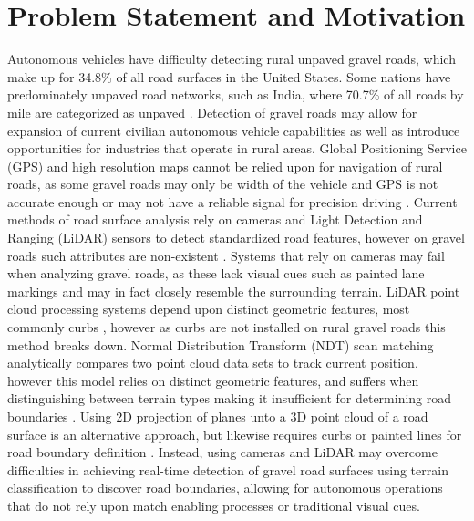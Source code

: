\documentclass[numbered,pdftex]{ohio-etd}
\begin{document}
\section{Problem Statement and Motivation}
{
	
	{Autonomous vehicles have difficulty detecting rural unpaved gravel roads, which make up for 34.8\% \cite{road_stats_2} of all road surfaces in the United States. Some nations have predominately unpaved road networks, such as India, where 70.7\% of all roads by mile are categorized as unpaved \cite{malik_lal_2019}. Detection of gravel roads may allow for expansion of current civilian autonomous vehicle capabilities as well as introduce opportunities for industries that operate in rural areas. Global Positioning Service (GPS) and high resolution maps cannot be relied upon for navigation of rural roads, as some gravel roads may only be width of the vehicle and GPS is not accurate enough or may not have a reliable signal for precision driving \cite{noauthor_gpsgov_nodate}. Current methods of road surface analysis rely on cameras and Light Detection and Ranging (LiDAR) sensors to detect standardized road features, however on gravel roads such attributes are non-existent \cite{skorseth_gravel_nodate}. Systems that rely on cameras may fail when analyzing gravel roads, as these lack visual cues such as painted lane markings \cite{crisman_scarf_1993} and may in fact closely resemble the surrounding terrain. LiDAR point cloud processing systems depend upon distinct geometric features, most commonly curbs \cite{yadav_extraction_2017,liu_new_2013,qiu_fast_2016,fernandes_road_2014,seker_experiments_nodate,yang_semi-automated_2013,miyazaki_line-based_2014,hervieu_road_2013,smadja_road_nodate}, however as curbs are not installed on rural gravel roads \cite{skorseth_gravel_nodate} this method breaks down. Normal Distribution Transform (NDT) scan matching analytically compares two point cloud data sets to track current position, however this model relies on distinct geometric features, and suffers when distinguishing between terrain types making it insufficient for determining road boundaries \cite{biber_normal_2003}. Using 2D projection of planes unto a 3D point cloud of a road surface is an alternative approach, but likewise requires curbs or painted lines for road boundary definition \cite{fernandes_road_2014, borkar_robust_2009-1, guo_lane_2015}. Instead, using cameras and LiDAR may overcome difficulties in achieving real-time detection of gravel road surfaces using terrain classification to discover road boundaries, allowing for autonomous operations that do not rely upon match enabling processes or traditional visual cues. }
	
}
\end{document}
